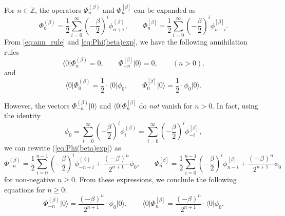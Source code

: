 \documentclass{amsart}
\def\ZZ{\mathord{\mathbb{Z}}}
\def\ket#1{\vert #1 \rangle}
\def\bra#1{\langle #1 \vert}
\begin{document}
For $n\in \ZZ$, the operators $\Phi_n^{(\beta)}$ and $\Phi_n^{[\beta]}$ can be expanded as
\begin{equation}\label{eq:Phi(beta)exp}
\Phi_n^{(\beta)}=
\frac{1}{2}\sum_{i=0}^\infty \left(-\frac{\beta}{2}\right)^i\phi^{(\beta)}_{n+i},\qquad
\Phi_n^{[\beta]}=
\frac{1}{2}\sum_{i=0}^\infty \left(-\frac{\beta}{2}\right)^i\phi^{[\beta]}_{n-i}.
\end{equation}
From \eqref{eq:ann_rule} and \eqref{eq:Phi(beta)exp}, we have the following annihilation rules
\begin{equation}\label{eq:ann_Phi}
\bra{0}\Phi_n^{(\beta)}=0,\qquad
\Phi_{-n}^{[\beta]}\ket{0}=0,\qquad(n>0).
\end{equation}
and
\begin{equation}\label{eq:ann_Phi_0}
\bra{0}\Phi_0^{(\beta)}=\frac{1}{2}\cdot \bra{0}\phi_0,\qquad
\Phi_{0}^{[\beta]}\ket{0}=\frac{1}{2}\cdot \phi_0\ket{0}.
\end{equation}

However, the vectors $\Phi_{-n}^{(\beta)}\ket{0}$ and $\bra{0}\Phi_{n}^{[\beta]}$ do \textit{not} vanish for $n>0$.
In fact, using the identity
\[
\phi_0
=
\sum_{i=0}^\infty \left(-\frac{\beta}{2}\right)^i\phi^{(\beta)}_{i}
=
\sum_{i=0}^\infty \left(-\frac{\beta}{2}\right)^i\phi^{[\beta]}_{-i},
%
\]
we can rewrite (\ref{eq:Phi(beta)exp}) as
\begin{equation}\label{eq:Phi_expand}
\Phi_{-n}^{(\beta)}
=
\frac{1}{2}\sum_{i=0}^{n-1}\left(-\frac{\beta}{2}\right)^i\phi^{(\beta)}_{-n+i}+\frac{(-\beta)^n}{2^{n+1}}\phi_0,\qquad %
\Phi_{n}^{[\beta]}
=
\frac{1}{2}\sum_{i=0}^{n-1}\left(-\frac{\beta}{2}\right)^i\phi^{[\beta]}_{n-i}+\frac{(-\beta)^n}{2^{n+1}}\phi_0
\end{equation}
for non-negative $n\geq 0$.
From these expressions, we conclude the following equations for $n\geq 0$:
\begin{equation}\label{eq:lack_of_ann_rule}
\Phi_{-n}^{(\beta)}\ket{0}=
\frac{(-\beta)^n}{2^{n+1}}\cdot \phi_0\ket{0},\qquad
\bra{0}\Phi_n^{[\beta]}=\frac{(-\beta)^n}{2^{n+1}}\cdot \bra{0}\phi_0.
\end{equation}
\end{document}
